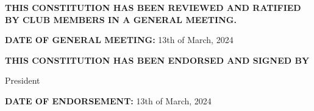 \textbf{THIS CONSTITUTION HAS BEEN REVIEWED AND RATIFIED BY CLUB MEMBERS IN A GENERAL MEETING.}

\vspace{0.5cm}
\textbf{DATE OF GENERAL MEETING:} 13th of March, 2024

\vspace{0.5cm}
\textbf{THIS CONSTITUTION HAS BEEN ENDORSED AND SIGNED BY}

\signature{David Maslov}{President}

\vspace{0.5cm}
\textbf{DATE OF ENDORSEMENT:} 13th of March, 2024
